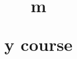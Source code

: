 \documentclass{xourse}
\title{m

y course}
\begin{document}
\begin{abstract}
\end{abstract}
\maketitle
{}
\end{document}
